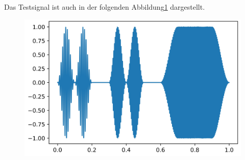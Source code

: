 Das Testsignal ist auch in der folgenden Abbildung\ref{fig:frame-testsig} dargestellt.
\begin{figure}[!ht]
	\centering
	\includegraphics[width=0.9\columnwidth]{papers/autotune/sections/frames/images/testsig.jpg}
	\label{fig:frame-testsig}
\end{figure}%


